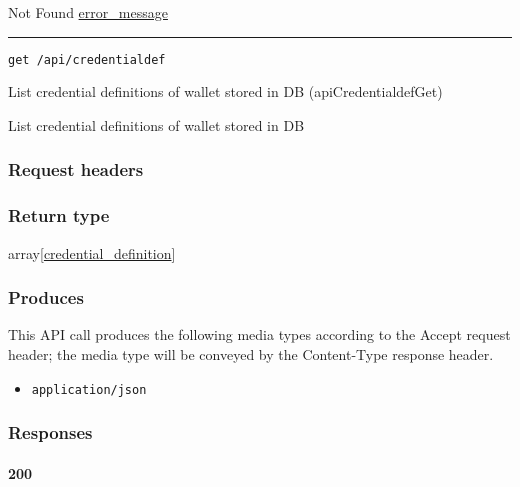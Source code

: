 Not Found \protect\hyperlink{error_message}{error\_message}

\begin{center}\rule{0.5\linewidth}{\linethickness}\end{center}

\protect\hypertarget{apiCredentialdefGet}{}{}

\begin{verbatim}
get /api/credentialdef
\end{verbatim}

List credential definitions of wallet stored in DB
({apiCredentialdefGet})

List credential definitions of wallet stored in DB

\hypertarget{request-headers-34}{%
\subsubsection{Request headers}\label{request-headers-34}}

\hypertarget{return-type-50}{%
\subsubsection{Return type}\label{return-type-50}}

array{[}\protect\hyperlink{credential_definition}{credential\_definition}{]}

\hypertarget{produces-62}{%
\subsubsection{Produces}\label{produces-62}}

This API call produces the following media types according to the
{Accept} request header; the media type will be conveyed by the
{Content-Type} response header.

\begin{itemize}
\tightlist
\item
  \texttt{application/json}
\end{itemize}

\hypertarget{responses-62}{%
\subsubsection{Responses}\label{responses-62}}

\hypertarget{section-206}{%
\paragraph{200}\label{section-206}}

